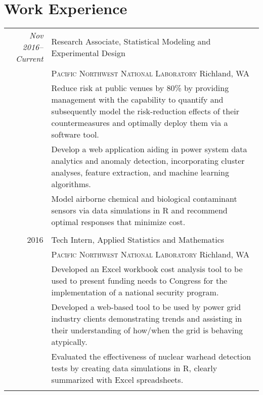 \documentclass[a4paper,12pt]{article}
\begin{document}
\section{Work Experience}
\begin{tabular}{r|p{11cm}}
  \emph{Nov 2016--Current} & Research Associate, Statistical Modeling and Experimental Design \\
  & \textsc{Pacific Northwest National Laboratory} Richland, WA \\
  & \footnotesize{Reduce risk at public venues by 80\% by providing management with the capability to quantify and subsequently model the risk-reduction effects of their countermeasures and optimally deploy them via a software tool.} \\
  & \footnotesize{Develop a web application aiding in power system data analytics and anomaly detection, incorporating cluster analyses, feature extraction, and machine learning algorithms.} \\
  & \footnotesize{Model airborne chemical and biological contaminant sensors via data simulations in R and recommend optimal responses that minimize cost.} \\ \multicolumn{2}{c}{} \\
  
  \textsc{2016} & Tech Intern, Applied Statistics and Mathematics \\
  & \textsc{Pacific Northwest National Laboratory} Richland, WA \\
  & \footnotesize{Developed an Excel workbook cost analysis tool to be used to present funding needs to Congress for the implementation of a national security program.} \\
  & \footnotesize{Developed a web-based tool to be used by power grid industry clients demonstrating trends and assisting in their understanding of how/when the grid is behaving atypically.} \\
  & \footnotesize{Evaluated the effectiveness of nuclear warhead detection tests by creating data simulations in R, clearly summarized with Excel spreadsheets.} \\ \multicolumn{2}{c}{} \\
  
\end{tabular}
\end{document}

